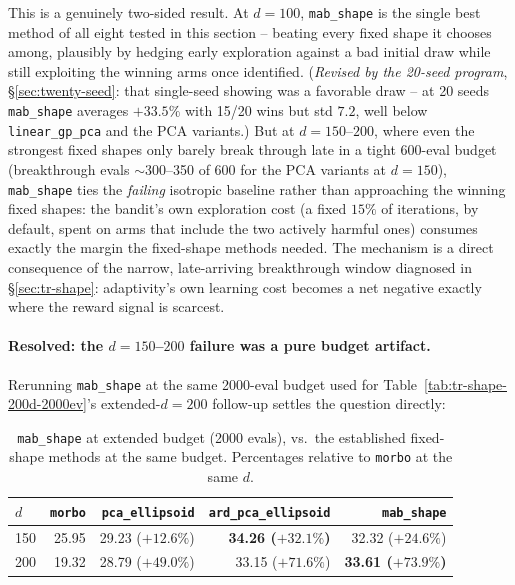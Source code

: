 \documentclass[11pt]{article}
\begin{document}
This is a genuinely two-sided result. At $d{=}100$, \texttt{mab\_shape} is
the single best method of all eight tested in this section -- beating
every fixed shape it chooses among, plausibly by hedging early exploration
against a bad initial draw while still exploiting the winning arms once
identified. (\emph{Revised by the 20-seed program},
\S\ref{sec:twenty-seed}: that single-seed showing was a favorable draw --
at 20 seeds \texttt{mab\_shape} averages $+33.5\%$ with 15/20 wins but
std $7.2$, well below \texttt{linear\_gp\_pca} and the PCA variants.) But at $d{=}150$--$200$, where even the strongest fixed shapes
only barely break through late in a tight 600-eval budget
(breakthrough evals $\sim$300--350 of 600 for the PCA variants at
$d{=}150$), \texttt{mab\_shape} ties the \emph{failing} isotropic baseline
rather than approaching the winning fixed shapes: the bandit's own
exploration cost (a fixed $15\%$ of iterations, by default, spent on arms
that include the two actively harmful ones) consumes exactly the margin
the fixed-shape methods needed. The mechanism is a direct consequence of
the narrow, late-arriving breakthrough window diagnosed in
\S\ref{sec:tr-shape}: adaptivity's own learning cost becomes a net
negative exactly where the reward signal is scarcest.

\paragraph{Resolved: the $d{=}150$--$200$ failure was a pure budget
artifact.} Rerunning \texttt{mab\_shape} at the same 2000-eval budget used
for Table~\ref{tab:tr-shape-200d-2000ev}'s extended-$d{=}200$ follow-up
settles the question directly:

\begin{table}[h]
\centering
\caption{\texttt{mab\_shape} at extended budget (2000 evals), vs.\ the
established fixed-shape methods at the same budget. Percentages relative
to \texttt{morbo} at the same $d$.}
\label{tab:tr-shape-mab-2000ev}
\begin{tabular}{lrrrr}
\toprule
$d$ & \texttt{morbo} & \texttt{pca\_ellipsoid} & \texttt{ard\_pca\_ellipsoid} & \texttt{mab\_shape} \\
\midrule
150 & 25.95 & 29.23 ($+12.6\%$) & \textbf{34.26 ($+32.1\%$)} & 32.32 ($+24.6\%$) \\
200 & 19.32 & 28.79 ($+49.0\%$) & 33.15 ($+71.6\%$) & \textbf{33.61 ($+73.9\%$)} \\
\bottomrule
\end{tabular}
\end{table}
\end{document}
